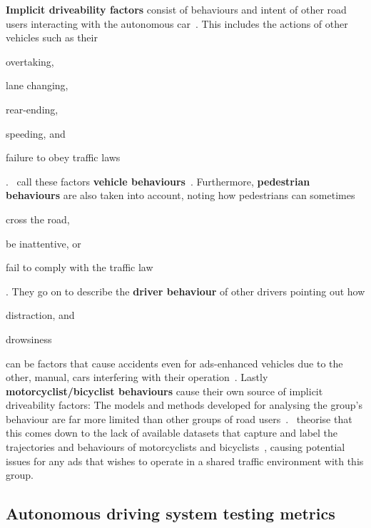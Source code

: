 \textbf{Implicit driveability factors} consist of behaviours and intent of other road users
interacting with the autonomous car~\cite[3138]{safeToDrive}. This includes the actions of other
vehicles such as their \begin{inparaenum}
    \item overtaking,
    \item lane changing,
    \item rear-ending,
    \item speeding, and
    \item failure to obey traffic laws \end{inparaenum}.~\citeauthor{safeToDrive} call these factors
\textbf{vehicle behaviours}~\cite[3138]{safeToDrive}. Furthermore, \textbf{pedestrian behaviours}
are also taken into account, noting how pedestrians can sometimes
\begin{inparaenum}\setcounter{enumi}{5}
    \item cross the road,
    \item be inattentive, or
    \item fail to comply with the traffic law \end{inparaenum}\cite[3138]{safeToDrive}. They go on
to describe the \textbf{driver behaviour} of other drivers pointing out how
\begin{inparaenum}\setcounter{enumi}{8}
    \item distraction, and
    \item drowsiness \end{inparaenum} can be factors that cause accidents even for
\acrshort{ads}-enhanced vehicles due to the other, manual, cars
interfering with their operation~\cite[3138-3139]{safeToDrive}. Lastly
\textbf{motorcyclist/bicyclist behaviours} cause their own source of implicit driveability factors:
The models and methods developed for analysing the group's behaviour are far more limited than other
groups of road users~\cite[3139]{safeToDrive}.~\citeauthor{safeToDrive} theorise that this comes
down to the lack of available datasets that capture and label the trajectories and behaviours
of motorcyclists and bicyclists~\cite[3139]{safeToDrive}, causing potential issues for any
\acrshort{ads} that wishes to operate in a shared traffic environment with this group.

\subsection{Autonomous driving system testing metrics}\label{sec:adsMetrics}

